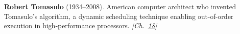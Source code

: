 \textbf{Robert Tomasulo} (1934–2008). American computer architect who invented Tomasulo's algorithm, a dynamic scheduling technique enabling out-of-order execution in high-performance processors. \emph{[Ch.~\hyperref[ch:speculativeexecutionattacks]{18}]}

